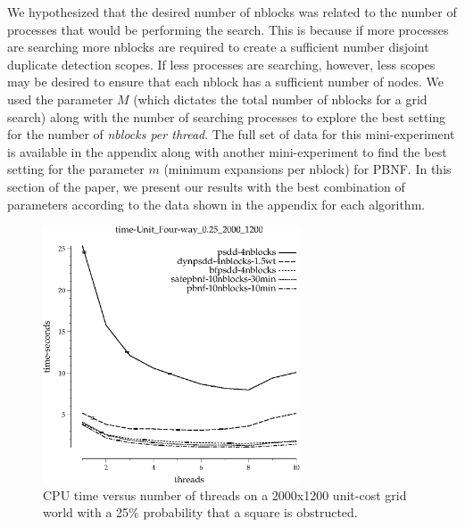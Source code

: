 \documentclass{article}
\begin{document}
We hypothesized that the desired number of nblocks was related to the
number of processes that would be performing the search.  This is
because if more processes are searching more nblocks are required to
create a sufficient number disjoint duplicate detection scopes.  If
less processes are searching, however, less scopes may be desired to
ensure that each nblock has a sufficient number of nodes.  We used the
parameter $M$ (which dictates the total number of nblocks for a grid
search) along with the number of searching processes to explore the
best setting for the number of \emph{nblocks per thread}.  The full
set of data for this mini-experiment is available in the appendix
along with another mini-experiment to find the best setting for the
parameter $m$ (minimum expansions per nblock) for PBNF.  In this
section of the paper, we present our results with the best combination
of parameters according to the data shown in the appendix for each
algorithm.

\begin{figure}[t]
\includegraphics[width=3in]{../graphs/grid_unit_four-way_0.25_2000_1200/time-Unit_Four-way_0.25_2000_1200.eps}
\caption{CPU time versus number of threads on a 2000x1200 unit-cost
  grid world with a 25\% probability that a square is obstructed.}
\label{fig:grid-unit}
\end{figure}
\end{document}
